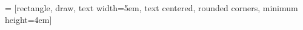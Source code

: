 
\newcommand{\KN}{$\mathrm{Kn}$}%






\newcommand{\colvec}[1]{\ensuremath{\begin{pmatrix}#1\end{pmatrix}}}


\DeclareRobustCommand\full  {\tikz[baseline=-0.6ex]\draw[thick] (0,0)--(0.5,0);}
\DeclareRobustCommand\dotted{\tikz[baseline=-0.6ex]\draw[thick,dotted] (0,0)--(0.54,0);}
\DeclareRobustCommand\dashed{\tikz[baseline=-0.6ex]\draw[thick,dashed] (0,0)--(0.54,0);}
\DeclareRobustCommand\chain {\tikz[baseline=-0.6ex]\draw[thick,dash dot dot] (0,0)--(0.5,0);}
 = [rectangle, draw, 
text width=5em, text centered, rounded corners, minimum height=4em]
